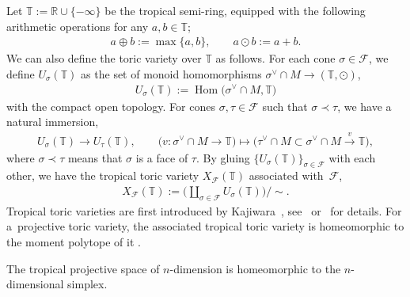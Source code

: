 \documentclass[10pt,a4paper]{amsart}
\numberwithin{equation}{section}
\begin{document}
Let ${\mathbb T}:={\mathbb R} \cup \{ -\infty \}$ be the tropical semi-ring, equipped with the following arithmetic operations for any $a, b \in {\mathbb T}$;
\begin{gather*}
a \oplus b :=\max \{ a, b \}, \qquad a \odot b :=a+b.
\end{gather*}
We can also def\/ine the toric variety over ${\mathbb T}$ as follows. For each cone $\sigma \in {\mathcal F}$, we def\/ine $U_\sigma({\mathbb T})$ as the set of monoid homomorphisms $\sigma^\vee \cap M \to ({\mathbb T}, \odot)$,
\begin{gather*}
U_\sigma({\mathbb T}):=\operatorname{Hom}\big(\sigma^\vee \cap M, {\mathbb T}\big)
\end{gather*}
with the compact open topology. For cones $\sigma, \tau \in {\mathcal F}$ such that $\sigma \prec \tau$, we have a natural immersion,
\begin{gather*}
U_\sigma({\mathbb T}) \to U_\tau({\mathbb T}),\qquad \big(v \colon \sigma^\vee \cap M \to {\mathbb T}\big) \mapsto \big(\tau^\vee \cap M \subset \sigma^\vee \cap M \xrightarrow{v} {\mathbb T}\big),
\end{gather*}
where $\sigma \prec \tau$ means that $\sigma$ is a face of $\tau$. By gluing $\{ U_\sigma({\mathbb T}) \}_{\sigma \in {\mathcal F}}$ with each other, we have the tropical toric variety $X_{\mathcal F}({\mathbb T})$ associated with~${\mathcal F}$,
\begin{gather*}
X_{\mathcal F}({\mathbb T}):=\bigg( \coprod_{\sigma \in {\mathcal F}} U_\sigma({\mathbb T}) \bigg) \bigg/ {\sim}.
\end{gather*}
Tropical toric varieties are f\/irst introduced by Kajiwara~\cite{KajiwaraPre}, see~\cite{KajiwaraPre} or~\cite{MR2428356} for details. For a~projective toric variety, the associated tropical toric variety is homeomorphic to the moment polytope of it \cite[Remark~1.3]{MR2428356}.

\begin{Example}The tropical projective space of $n$-dimension is homeomorphic to the $n$-dimen\-sio\-nal simplex.
\end{Example}
\end{document}
